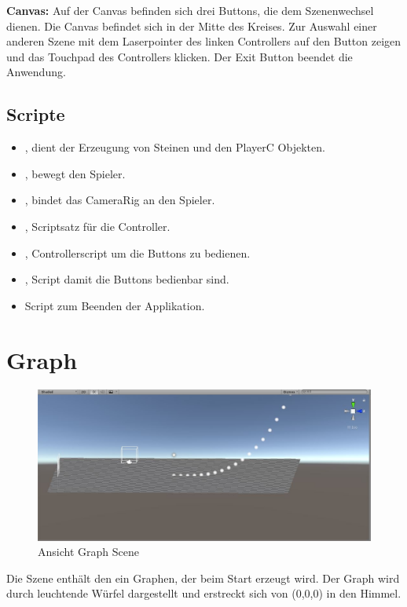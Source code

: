 \textbf{Canvas: } Auf der Canvas befinden sich drei Buttons, die dem Szenenwechsel dienen. Die Canvas befindet sich in der Mitte des Kreises. Zur Auswahl einer anderen Szene mit dem Laserpointer des linken Controllers auf den Button zeigen und das Touchpad des Controllers klicken. Der Exit Button beendet die Anwendung.

\subsection{Scripte}
\label{Spiralscripts}
\begin{itemize}
	\item {}, dient der Erzeugung von Steinen und den PlayerC Objekten.
	\item {}, bewegt den Spieler.
	\item {}, bindet das CameraRig an den Spieler.
	\item {}, Scriptsatz für die Controller.
	\item {}, Controllerscript um die Buttons zu bedienen.
	\item {}, Script damit die Buttons bedienbar sind.
	\item {} Script zum Beenden der Applikation.
\end{itemize}

\section{Graph}
\label{ graphScene }

\begin{figure}[h!]
	\includegraphics[scale=0.85]{bilder/graphScene.jpg}
	\caption{Ansicht Graph Scene}
\end{figure}

Die Szene enthält den ein Graphen, der beim Start erzeugt wird. Der Graph wird durch leuchtende Würfel dargestellt und erstreckt sich von (0,0,0) in \glqq den Himmel\grqq{}.

